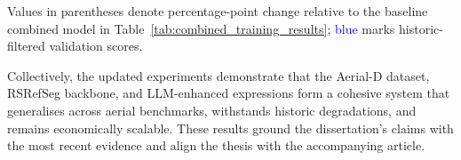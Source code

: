 \begin{table}[t]
\centering
\caption{Historic-filter ablations. Each row lists the clean score followed by the historic-filter variant (blue) with percentage-point deltas relative to Table~\ref{tab:combined_training_results}; the second row also removes Urban1960SatSeg supervision.}
\label{tab:historic_ablation_results}
\renewcommand{\arraystretch}{1.1}
\renewcommand{\arraystretch}{1}
\end{table}

Values in parentheses denote percentage-point change relative to the baseline combined model in Table~\ref{tab:combined_training_results}; \textcolor{blue}{blue} marks historic-filtered validation scores.

Collectively, the updated experiments demonstrate that the Aerial-D dataset, RSRefSeg backbone, and LLM-enhanced expressions form a cohesive system that generalises across aerial benchmarks, withstands historic degradations, and remains economically scalable. These results ground the dissertation's claims with the most recent evidence and align the thesis with the accompanying article.